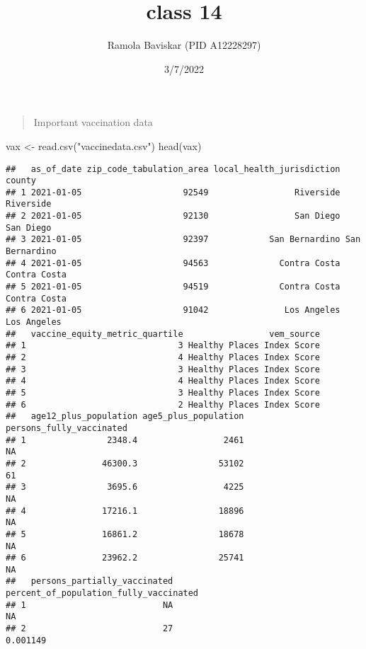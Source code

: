 \documentclass[
]{article}
\title{class 14}
\author{Ramola Baviskar (PID A12228297)}
\date{3/7/2022}
\newenvironment{Shaded}{\begin{snugshade}}{\end{snugshade}}
\newcommand{\FunctionTok}[1]{\textcolor[rgb]{0.00,0.00,0.00}{#1}}
\newcommand{\NormalTok}[1]{#1}
\newcommand{\OtherTok}[1]{\textcolor[rgb]{0.56,0.35,0.01}{#1}}
\newcommand{\StringTok}[1]{\textcolor[rgb]{0.31,0.60,0.02}{#1}}
\begin{document}
\maketitle

\begin{quote}
Important vaccination data
\end{quote}

\begin{Shaded}
\begin{Highlighting}[]
\NormalTok{vax }\OtherTok{\textless{}{-}} \FunctionTok{read.csv}\NormalTok{(}\StringTok{"vaccinedata.csv"}\NormalTok{)}
\FunctionTok{head}\NormalTok{(vax)}
\end{Highlighting}
\end{Shaded}

\begin{verbatim}
##   as_of_date zip_code_tabulation_area local_health_jurisdiction         county
## 1 2021-01-05                    92549                 Riverside      Riverside
## 2 2021-01-05                    92130                 San Diego      San Diego
## 3 2021-01-05                    92397            San Bernardino San Bernardino
## 4 2021-01-05                    94563              Contra Costa   Contra Costa
## 5 2021-01-05                    94519              Contra Costa   Contra Costa
## 6 2021-01-05                    91042               Los Angeles    Los Angeles
##   vaccine_equity_metric_quartile                 vem_source
## 1                              3 Healthy Places Index Score
## 2                              4 Healthy Places Index Score
## 3                              3 Healthy Places Index Score
## 4                              4 Healthy Places Index Score
## 5                              3 Healthy Places Index Score
## 6                              2 Healthy Places Index Score
##   age12_plus_population age5_plus_population persons_fully_vaccinated
## 1                2348.4                 2461                       NA
## 2               46300.3                53102                       61
## 3                3695.6                 4225                       NA
## 4               17216.1                18896                       NA
## 5               16861.2                18678                       NA
## 6               23962.2                25741                       NA
##   persons_partially_vaccinated percent_of_population_fully_vaccinated
## 1                           NA                                     NA
## 2                           27                               0.001149

\end{verbatim}
\end{document}

